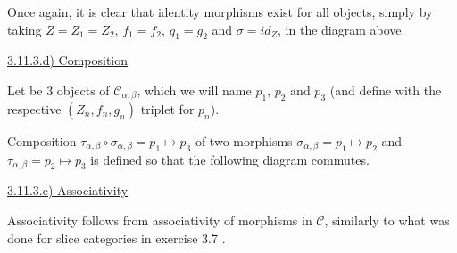 \documentclass[12pt, letterpaper, twoside]{report}
\begin{document}
Once again, it is clear that identity morphisms exist for all objects, simply by taking $Z = Z_1 = Z_2$, $f_1 = f_2$, $g_1 = g_2$ and $\sigma = id_Z$, in the diagram above.


\vspace{5mm}
\underline{3.11.3.d) Composition}

Let be 3 objects of $\mathcal{C}_{\alpha, \beta}$, which we will name $p_1$, $p_2$ and $p_3$ (and define with the respective $(Z_n, f_n, g_n)$ triplet for $p_n$).

Composition $\tau_{\alpha, \beta} \circ \sigma_{\alpha, \beta} = p_1 \mapsto p_3$ of two morphisms $\sigma_{\alpha, \beta} = p_1 \mapsto p_2$ and $\tau_{\alpha, \beta} = p_2 \mapsto p_3$ is defined so that the following diagram commutes.



\vspace{5mm}
\underline{3.11.3.e) Associativity}

Associativity follows from associativity of morphisms in $\mathcal{C}$, similarly to what was done for slice categories in exercise 3.7 .
\end{document}
